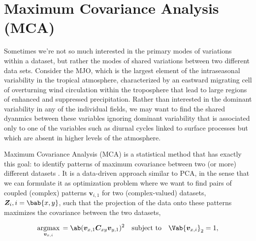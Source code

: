 


\section{Maximum Covariance Analysis (MCA)}

Sometimes we're not so much interested in the primary modes of variations within a dataset, but rather the modes of shared variations between two different data sets. Consider the MJO, which is the largest element of the intraseasonal variability in the tropical atmosphere, characterized by an eastward migrating cell of overturning wind circulation within the troposphere that lead to large regions of enhanced and suppressed precipitation. Rather than interested in the dominant variability in any of the individual fields, we may want to find the shared dyanmics between these variables ignoring dominant variability that is associated only to one of the variables such as diurnal cycles linked to surface processes but which are absent in higher levels of the atmosphere.

Maximum Covariance Analysis (MCA) is a statistical method that has exactly this goal: to identify patterns of maximum covariance between two (or more) different datasets \cite[][p. 321]{storch_statistical_2003}. It is a data-driven approach similar to PCA, in the sense that we can formulate it as optimization problem where we want to find pairs of coupled (complex) patterns $\bm{v}_{i,1}$ for two (complex-valued) datasets, $\bm{Z}_i, i=\bab{x, y}$, such that the projection of the data onto these patterns maximizes the covariance between the two datasets,

\begin{align}\label{eq:theory:mca_maximization}
    \argmax_{\bm{v}_{x,i}} \, = \ab(\bm{v}_{x,1} \bm{C}_{xy} \bm{v}_{y,1})^2 \quad \text{subject to} \quad \Vab{\bm{v}_{x,i}}_2 = 1,
\end{align}

